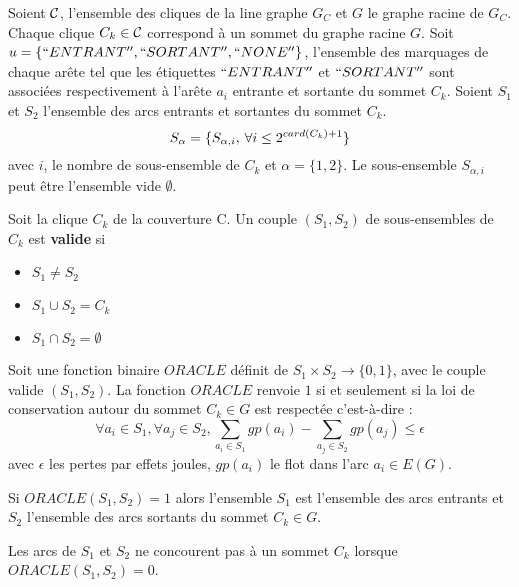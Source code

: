 Soient $\cal C$, l'ensemble des cliques de la line graphe $G_C$ et $G$ le graphe racine de $G_C$. \newline
Chaque clique $C_k \in {\cal C}$ correspond \`a un sommet du graphe racine $G$. \newline 
Soit $u = \{``ENTRANT'', ``SORTANT'', ``NONE''\}$, l'ensemble des marquages de chaque ar\^ete tel que les \'etiquettes $``ENTRANT''$ et $``SORTANT''$ sont associ\'ees respectivement \`a l'ar\^ete $a_i$ entrante et sortante du sommet $C_k$.
\newline
Soient $S_1$ et $S_2$ l'ensemble des arcs entrants et sortantes du sommet $C_k$.
\begin{equation}
S_\alpha = \{ S_{\alpha,i}, \hspace{0.2 em} \forall i \le 2^{card(C_k)+1}  \}
\end{equation}
avec $i$, le nombre de sous-ensemble de $C_k$ et $\alpha = \{1,2\}$. Le sous-ensemble $S_{\alpha,i}$ peut \^etre  l'ensemble vide $\emptyset$.
 
 \begin{definition}
 Soit la clique $C_k$ de la couverture {\cal C}.
 Un couple $(S_1,S_2)$ de sous-ensembles de $C_k$ est {\bf valide} si 
 \begin{itemize}
 \item $S_1 \ne S_2$
 \item $S_1 \cup S_2 = C_k$
 \item $S_1 \cap S_2 = \emptyset$
 \end{itemize}
 \end{definition}
 
 \begin{definition}
 Soit une fonction binaire $ORACLE$ d\'efinit de $S_1 \times S_2 \rightarrow \{0,1\}$, avec le couple valide $(S_1,S_2)$.
 La fonction $ORACLE$ renvoie $1$ si et seulement si la loi de conservation autour du sommet $C_k \in G$ est respect\'ee c'est-\`a-dire : 
 \begin{equation}
 \forall a_i \in S_1, \forall a_j \in S_2, \sum_{a_i \in S_1} gp(a_i) - \sum_{a_j \in S_2} gp(a_j) \le \epsilon
 \end{equation}
 avec $\epsilon$ les pertes par effets joules, $gp(a_i)$ le flot dans l'arc $a_i \in E(G)$.
 \end{definition}
 
 \begin{property}
 Si $ORACLE(S_1, S_2) = 1$ alors l'ensemble  $S_1$ est l'ensemble des arcs entrants et  $S_2$ l'ensemble des arcs sortants du sommet $C_k \in G$.
 \end{property} 
Les arcs de $S_1$ et $S_2$ ne concourent pas \`a un sommet $C_k$ lorsque  $ORACLE(S_1, S_2) = 0$.

